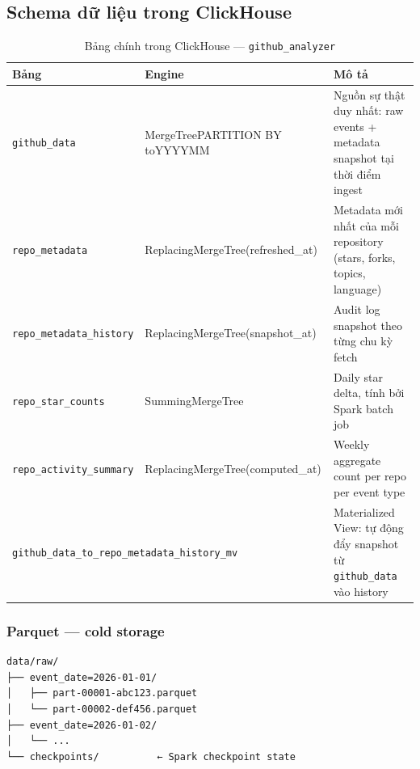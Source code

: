 \documentclass[12pt,a4paper]{article}
\newcommand{\tech}[1]{\texttt{#1}}
\begin{document}
\subsection{Schema dữ liệu trong ClickHouse}

\begin{table}[H]
  \centering
  \caption{Bảng chính trong ClickHouse — \tech{github\_analyzer}}
  \begin{tabularx}{\linewidth}{p{4.2cm}p{3cm}X}
    \toprule
    \textbf{Bảng} & \textbf{Engine} & \textbf{Mô tả} \\
    \midrule
    \tech{github\_data}
      & MergeTree\newline PARTITION BY toYYYYMM
      & Nguồn sự thật duy nhất: raw events + metadata snapshot tại thời điểm ingest \\
    \tech{repo\_metadata}
      & ReplacingMergeTree\newline (refreshed\_at)
      & Metadata mới nhất của mỗi repository (stars, forks, topics, language) \\
    \tech{repo\_metadata\_history}
      & ReplacingMergeTree\newline (snapshot\_at)
      & Audit log snapshot theo từng chu kỳ fetch \\
    \tech{repo\_star\_counts}
      & SummingMergeTree
      & Daily star delta, tính bởi Spark batch job \\
    \tech{repo\_activity\_summary}
      & ReplacingMergeTree\newline (computed\_at)
      & Weekly aggregate count per repo per event type \\
    \midrule
    \multicolumn{2}{l}{\tech{github\_data\_to\_repo\_metadata\_history\_mv}}
      & Materialized View: tự động đẩy snapshot từ \tech{github\_data} vào history \\
    \bottomrule
  \end{tabularx}
\end{table}

\subsubsection*{Parquet — cold storage}

\begin{lstlisting}[caption={Cấu trúc thư mục Parquet (Hive partitioning)}]
data/raw/
├── event_date=2026-01-01/
│   ├── part-00001-abc123.parquet
│   └── part-00002-def456.parquet
├── event_date=2026-01-02/
│   └── ...
└── checkpoints/          ← Spark checkpoint state
\end{lstlisting}
\end{document}
